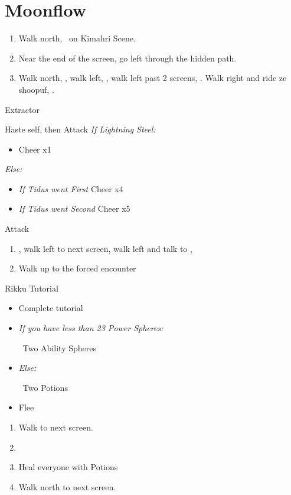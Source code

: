 \chapter{Moonflow}

\begin{enumerate}
	\item Walk north, \sd\ on Kimahri Scene.
	\item Near the end of the screen, go left through the hidden path. 
	\item Walk north, \sd, walk left, \sd, walk left past 2 screens, \sd. Walk right and ride ze shoopuf, \sd.
\end{enumerate}
\begin{battle}[4000]{Extractor}
\begin{itemize}
	\tidusf Haste self, then \wakka
	\wakkaf Attack
	\tidusf \textit{If Lightning Steel:}
	\begin{itemize}
		\item Cheer x1
	\end{itemize}
	\textit{Else:}
	\begin{itemize}
		\item \textit{If Tidus went First} Cheer x4 
		\item \textit{If Tidus went Second} Cheer x5
	\end{itemize}
	\tidusf Attack
\end{itemize}
\end{battle}
\begin{enumerate}[resume]
	\item \sd, walk left to next screen, walk left and talk to \rikku, \sd
	\item Walk up to the forced encounter
\end{enumerate}
\begin{battle}{Rikku Tutorial}
\begin{itemize}
	\item Complete tutorial
	\item \textit{If you have less than 23 Power Spheres:}
	\begin{itemize}
		\rikkuf \od\ Two Ability Spheres
	\end{itemize}
	\item \textit{Else:}
	\begin{itemize}
		\rikkuf \od\ Two Potions
	\end{itemize}
	\item Flee
\end{itemize}
\end{battle}
\begin{enumerate}[resume]
	\item Walk to next screen.
	\item \formation{\tidus}{\yuna}{\auron}
	\item Heal everyone with Potions
	\item Walk north to next screen.
\end{enumerate}